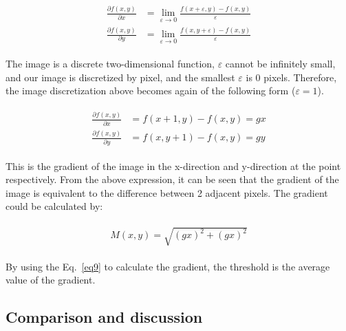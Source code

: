 \documentclass[hyperref]{article}
\theoremstyle{nonumberplain}
\begin{document}
	\begin{equation}
	\begin{split}
	\begin{aligned}
	\frac{\partial f(x,y)}{\partial x}&=\lim_{\varepsilon \rightarrow 0}\frac{f(x+\varepsilon,y)-f(x,y)}{\varepsilon}\\
	\frac{\partial f(x,y)}{\partial y}&=\lim_{\varepsilon \rightarrow 0}\frac{f(x,y+\varepsilon)-f(x,y)}{\varepsilon}
	\end{aligned}
	\end{split}
	\label{eq7}
	\end{equation}
	
	The image is a discrete two-dimensional function, $\varepsilon$ cannot be infinitely small, and our image is discretized by pixel, and the smallest $\varepsilon$ is 0 pixels. Therefore, the image discretization above becomes again of the following form ($\varepsilon=1$).
	
	\begin{equation}
	\begin{split}
	\begin{aligned}
	\frac{\partial f(x,y)}{\partial x}&=f(x+1,y)-f(x,y)=gx\\
	\frac{\partial f(x,y)}{\partial y}&=f(x,y+1)-f(x,y)=gy
	\end{aligned}
	\end{split}
	\label{eq8}
	\end{equation}
	
	This is the gradient of the image in the x-direction and y-direction at the point respectively. From the above expression, it can be seen that the gradient of the image is equivalent to the difference between 2 adjacent pixels. The gradient could be calculated by:
	
	\begin{equation}
	\begin{split}
	\begin{aligned}
	M(x,y)=\sqrt{(gx)^{2}+(gx)^{2}}
	\end{aligned}
	\end{split}
	\label{eq9}
	\end{equation}
	
	By using the Eq.~\ref{eq9} to calculate the gradient, the threshold is the average value of the gradient.
	
	\subsection{Comparison and discussion}
	
\end{document}

